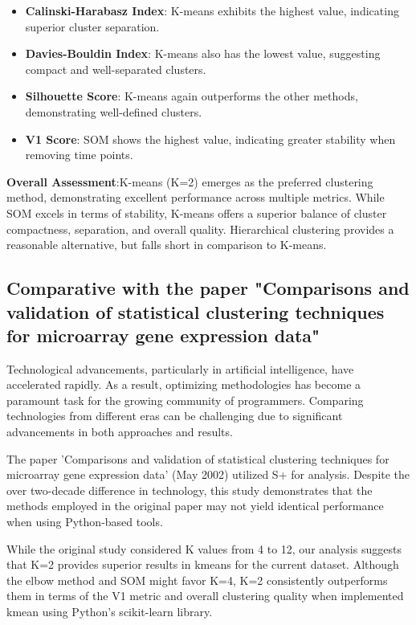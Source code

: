 \documentclass{llncs}
\begin{document}
  \begin{itemize}
  	\item \textbf{Calinski-Harabasz Index}: K-means exhibits the highest value, indicating superior cluster separation.
  	\item \textbf{Davies-Bouldin Index}: K-means also has the lowest value, suggesting compact and well-separated clusters.
  	\item \textbf{Silhouette Score}: K-means again outperforms the other methods, demonstrating well-defined clusters.
  	\item \textbf{V1 Score}: SOM shows the highest value, indicating greater stability when removing time points.
  \end{itemize}
  
  \textbf{Overall Assessment}:K-means (K=2) emerges as the preferred clustering method, demonstrating excellent performance across multiple metrics. While SOM excels in terms of stability, K-means offers a superior balance of cluster compactness, separation, and overall quality. Hierarchical clustering provides a reasonable alternative, but falls short in comparison to K-means.
  
  
  
  \subsection{Comparative with the paper "Comparisons and validation of statistical clustering techniques for microarray gene expression data"}
  
  Technological advancements, particularly in artificial intelligence, have accelerated rapidly. As a result, optimizing methodologies has become a paramount task for the growing community of programmers. Comparing technologies from different eras can be challenging due to significant advancements in both approaches and results.
  
  The paper 'Comparisons and validation of statistical clustering techniques for microarray gene expression data' (May 2002) utilized S+ for analysis. Despite the over two-decade difference in technology, this study demonstrates that the methods employed in the original paper may not yield identical performance when using Python-based tools.
  
  While the original study considered K values from 4 to 12, our analysis suggests that K=2 provides superior results in kmeans for the current dataset. Although the elbow method and SOM might favor K=4, K=2 consistently outperforms them in terms of the V1 metric and overall clustering quality when implemented kmean using Python's scikit-learn library.
 
\end{document}
